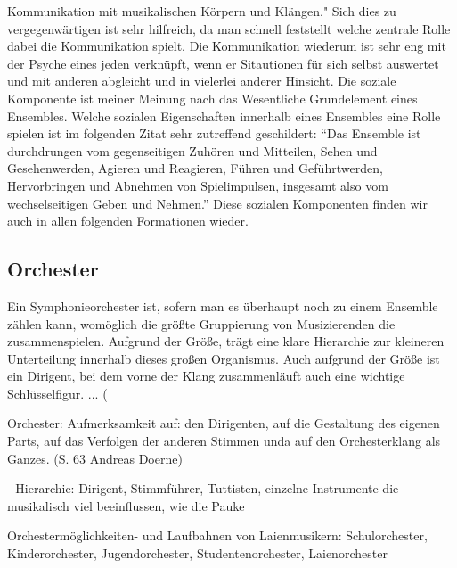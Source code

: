 Kommunikation mit musikalischen Körpern und Klängen."
\autocite[62]{doerne:umfassend_musizieren} Sich dies zu vergegenwärtigen ist
sehr hilfreich, da man schnell feststellt welche zentrale Rolle dabei die
Kommunikation spielt. Die Kommunikation wiederum ist sehr eng mit der Psyche
eines jeden verknüpft, wenn er Sitautionen für sich selbst auswertet und mit
anderen abgleicht und in vielerlei anderer Hinsicht. Die soziale Komponente ist
meiner Meinung nach das Wesentliche Grundelement eines Ensembles. Welche
sozialen Eigenschaften innerhalb eines Ensembles eine Rolle spielen ist im
folgenden Zitat sehr zutreffend geschildert: \enquote{Das Ensemble ist durchdrungen vom
gegenseitigen Zuhören und Mitteilen, Sehen und Gesehenwerden, Agieren und
Reagieren, Führen und Geführtwerden, Hervorbringen und Abnehmen von
Spielimpulsen, insgesamt also vom wechselseitigen Geben und Nehmen.}
\autocite[62]{doerne:umfassend_musizieren} Diese sozialen Komponenten finden wir
auch in allen folgenden Formationen wieder. 


\subsection{Orchester} 

Ein Symphonieorchester ist, sofern man es überhaupt noch zu einem Ensemble
zählen kann, womöglich die größte Gruppierung von Musizierenden die
zusammenspielen. Aufgrund der Größe, trägt eine klare Hierarchie zur kleineren
Unterteilung innerhalb dieses großen Organismus. Auch aufgrund der Größe ist ein
Dirigent, bei dem vorne der Klang zusammenläuft auch eine wichtige
Schlüsselfigur. ... (%

Orchester: Aufmerksamkeit auf: den Dirigenten, auf die Gestaltung des eigenen
Parts, auf das Verfolgen der anderen Stimmen unda auf den Orchesterklang als
Ganzes. (S. 63 Andreas Doerne)

- Hierarchie: Dirigent, Stimmführer, Tuttisten, einzelne Instrumente die
musikalisch viel beeinflussen, wie die Pauke

Orchestermöglichkeiten- und Laufbahnen von Laienmusikern: Schulorchester,
Kinderorchester, Jugendorchester, Studentenorchester, Laienorchester

